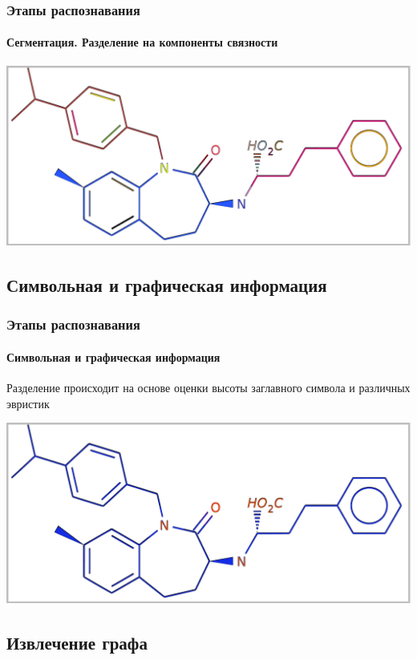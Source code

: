\begin{frame}
  \frametitle{Этапы распознавания}
  \framesubtitle{Сегментация. Разделение на компоненты связности}
  \begin{center}
  \includegraphics[scale=0.7]{media/mol_begin.pdf}
\end{center}

\end{frame}

\subsection{Символьная и графическая информация}

\begin{frame}
  \frametitle{Этапы распознавания}
  \framesubtitle{Символьная и графическая информация}
  Разделение происходит на основе оценки высоты заглавного символа и различных эвристик
  \begin{center}
  \includegraphics[scale=0.7]{media/mol2.pdf}
  \end{center}
\end{frame}

\subsection{Извлечение графа}


